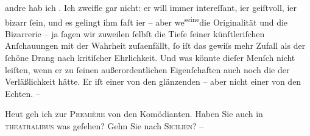               andre hab ich \label{K_L00387-2v}\label{K_L00387-2}. Ich zweifle gar nicht: er
               will immer intereſſant, i{\geminationm}er geiſtvoll, i{\geminationm}er bizarr{ }ſein, und es gelingt ihm faſt i{\geminationm}er – aber we{\geminationn}\substVorne{}\textsuperscript{seine}\substDazwischen{}die\substHinten{} Originalität {\pb}und die Bizarrerie – ja{ }ſagen
               wir zuweilen{ }ſelbſt die Tiefe{ }ſeiner künſtleriſchen Anſchauungen mit der Wahrheit
                  zuſa{\geminationm}enfällt,{ }ſo iſt das gewiſs mehr Zufall als der{ }ſchöne Drang nach kritiſcher Ehrlichkeit. Und was könnte dieſer Menſch nicht {\pb}leiſten, wenn er zu{ }ſeinen außerordentlichen
               Eigenſchaften auch noch die der Verläßlichkeit hätte. Er iſt einer von den glänzenden
               – aber nicht einer von den Echten. –\pend
           
\pstart
           Heut geh ich zur \textsc{Première} von den Komödianten. Haben Sie auch in \textsc{theatralibus} was {\pb}geſehen? Gehn Sie nach \textsc{Sicilien}? –\pend
           
